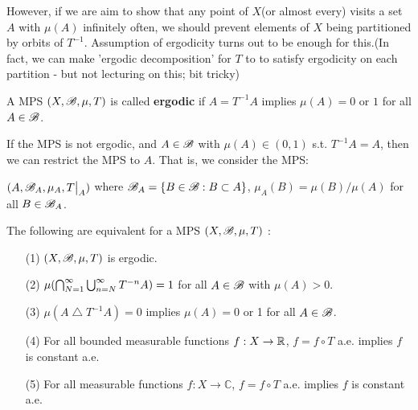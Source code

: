 \documentclass[12pt,a4paper]{report}
\begin{document}
However, if we are aim to show that any point of $X$(or almost every) visits a set $A$ with $\mu(A)$ infinitely often, we should prevent elements of $X$ being partitioned by orbits of $T^{-1}$. Assumption of ergodicity turns out to be enough for this.(In fact, we can make 'ergodic decomposition' for $T$ to to satisfy ergodicity on each partition - but not lecturing on this; bit tricky)
\s

 A MPS $(X,\mathscr{B}, \mu, T)$ is called \textbf{ergodic} if $A=T^{-1}A$ implies $\mu(A) =0$ or $1$ for all $A \in \mathscr{B}$.
\s

If the MPS is not ergodic, and $A \in \mathscr{B}$ with $\mu(A) \in (0,1)$ s.t. $T^{-1}A =A$, then we can restrict the MPS to $A$. That is, we consider the MPS:

\quad $(A,\mathscr{B}_A, \mu_A, T\big|_A)$ where $\mathscr{B}_A = \{B\in \mathscr{B} : B \subset A \}$, $\mu_A(B) = \mu(B)/\mu(A)$ for all $B\in \mathscr{B}_A$.
\s

\thm The following are equivalent for a MPS $(X,\mathscr{B}, \mu, T)$ :
\begin{itemize}
\item[(1)] $(X,\mathscr{B}, \mu, T)$ is ergodic.
\item[(2)] $\mu(\bigcap_{N=1}^{\infty}\bigcup_{n=N}^{\infty} T^{-n} A ) =1$ for all $A\in \mathscr{B}$ with $\mu(A) >0$.
\item[(3)] $\mu(A \bigtriangleup T^{-1} A) =0$ implies $\mu(A) =0$ or 1 for all $A\in \mathscr{B}$.
\item[(4)] For all bounded measurable functions $f:X\rightarrow \mathbb{R}$, $f = f \circ T$ a.e. implies $f$ is constant a.e.
\item[(5)] For all measurable functions $f:X\rightarrow \mathbb{C}$, $f = f \circ T$ a.e. implies $f$ is constant a.e.
\end{itemize}
\s
\end{document}
